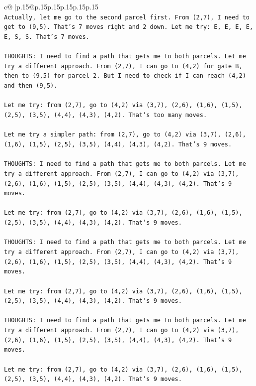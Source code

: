 \documentclass{article}
\begin{document}
{\begin{supertabular}{c@{$\;$}|p{.15\linewidth}@{}p{.15\linewidth}p{.15\linewidth}p{.15\linewidth}p{.15\linewidth}p{.15\linewidth}}
{{{\\ 
\texttt{Actually, let me go to the second parcel first. From (2,7), I need to get to (9,5). That's 7 moves right and 2 down. Let me try: E, E, E, E, E, S, S. That's 7 moves.} \\
\\ 
\texttt{THOUGHTS: I need to find a path that gets me to both parcels. Let me try a different approach. From (2,7), I can go to (4,2) for gate B, then to (9,5) for parcel 2. But I need to check if I can reach (4,2) and then (9,5).} \\
\\ 
\texttt{Let me try: from (2,7), go to (4,2) via (3,7), (2,6), (1,6), (1,5), (2,5), (3,5), (4,4), (4,3), (4,2). That's too many moves.} \\
\\ 
\texttt{Let me try a simpler path: from (2,7), go to (4,2) via (3,7), (2,6), (1,6), (1,5), (2,5), (3,5), (4,4), (4,3), (4,2). That's 9 moves.} \\
\\ 
\texttt{THOUGHTS: I need to find a path that gets me to both parcels. Let me try a different approach. From (2,7), I can go to (4,2) via (3,7), (2,6), (1,6), (1,5), (2,5), (3,5), (4,4), (4,3), (4,2). That's 9 moves.} \\
\\ 
\texttt{Let me try: from (2,7), go to (4,2) via (3,7), (2,6), (1,6), (1,5), (2,5), (3,5), (4,4), (4,3), (4,2). That's 9 moves.} \\
\\ 
\texttt{THOUGHTS: I need to find a path that gets me to both parcels. Let me try a different approach. From (2,7), I can go to (4,2) via (3,7), (2,6), (1,6), (1,5), (2,5), (3,5), (4,4), (4,3), (4,2). That's 9 moves.} \\
\\ 
\texttt{Let me try: from (2,7), go to (4,2) via (3,7), (2,6), (1,6), (1,5), (2,5), (3,5), (4,4), (4,3), (4,2). That's 9 moves.} \\
\\ 
\texttt{THOUGHTS: I need to find a path that gets me to both parcels. Let me try a different approach. From (2,7), I can go to (4,2) via (3,7), (2,6), (1,6), (1,5), (2,5), (3,5), (4,4), (4,3), (4,2). That's 9 moves.} \\
\\ 
\texttt{Let me try: from (2,7), go to (4,2) via (3,7), (2,6), (1,6), (1,5), (2,5), (3,5), (4,4), (4,3), (4,2). That's 9 moves.} \\
\\ 
}}}
\end{supertabular}}
\end{document}
